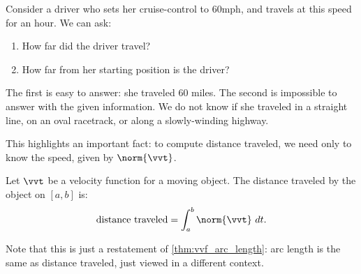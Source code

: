 Consider a driver who sets her cruise-control to 60mph, and travels at this speed for an hour. We can ask:
\begin{enumerate}
	\item How far did the driver travel?
	\item	How far from her starting position is the driver?
\end{enumerate} 
The first is easy to answer: she traveled 60 miles. The second is impossible to answer with the given information. We do not know if she traveled in a straight line, on an oval racetrack, or along a slowly-winding highway.

This highlights an important fact: to compute distance traveled, we need only to know the speed, given by $\norm{\vvt}$.

\begin{theorem}\label{thm:distance_traveled}
Let $\vvt$ be a velocity function for a moving object. The distance traveled by the object on $[a,b]$ is:
\[\text{distance traveled} = \int_a^b \norm{\vvt}\ dt.\]
\end{theorem}

Note that this is just a restatement of \autoref{thm:vvf_arc_length}: arc length is the same as distance traveled, just viewed in a different context.


